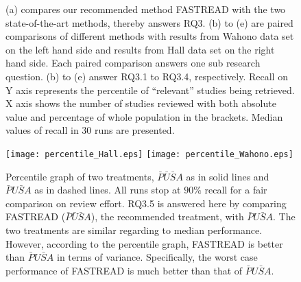 \documentclass[final,twocolumn,5p]{elsarticle}
\theoremstyle{break}
\begin{document}
\begin{figure}
    \centering
    \quad
    \quad
    \quad
    \quad
    
    
    \caption{(a) compares our recommended method FASTREAD with the two state-of-the-art methods, thereby answers RQ3. (b) to (e) are paired comparisons of different methods with results from Wahono data set on the left hand side and results from Hall data set on the right hand side. Each paired comparison answers one sub research question. (b) to (e) answer RQ3.1 to RQ3.4, respectively. Recall on Y axis represents the percentile of ``relevant'' studies being retrieved. X axis shows the number of studies reviewed with both absolute value and percentage of whole population in the brackets. Median values of recall in $30$ runs are presented. 
    }
    \label{fig:detail}
\end{figure}

\begin{figure}[ht]
    \centering
    \texttt{[image: percentile\_Hall.eps]}
    \texttt{[image: percentile\_Wahono.eps]}
    \caption{Percentile graph of two treatments, $\bar{P}\bar{U}\bar{S}A$ as in solid lines and $\bar{P}U\bar{S}A$ as in dashed lines. All runs stop at $90\%$ recall for a fair comparison on review effort. RQ3.5 is answered here by comparing FASTREAD ($\bar{P}\bar{U}\bar{S}A$), the recommended treatment, with $\bar{P}U\bar{S}A$. The two treatments are similar regarding to median performance. However, according to the percentile graph, FASTREAD is better than $\bar{P}U\bar{S}A$ in terms of variance. Specifically, the worst case performance of FASTREAD is much better than that of $\bar{P}U\bar{S}A$.}
    \label{fig:percentile}
\end{figure}
\end{document}
